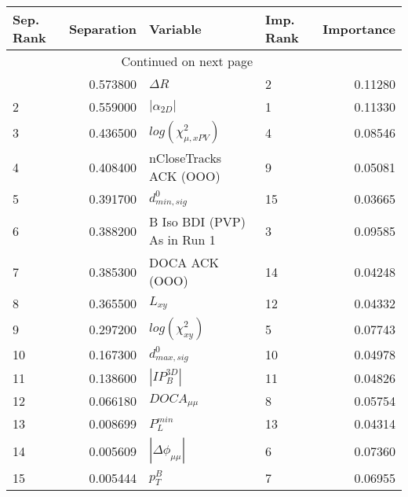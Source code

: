 \usepackage{lscape}

\begin{landscape}
\begin{longtable}{lrllr}
\toprule
Sep. Rank &  Separation &                     Variable & Imp. Rank &  Importance \\
\midrule
\endhead
\midrule
\multicolumn{3}{r}{{Continued on next page}} \\
\midrule
\endfoot

\bottomrule
\endlastfoot
        1 &    0.573800 &                   $\Delta R$ &         2 &     0.11280 \\
        2 &    0.559000 &              $|\alpha_{2D}|$ &         1 &     0.11330 \\
        3 &    0.436500 &    $log(\chi^{2}_{\mu,xPV})$ &         4 &     0.08546 \\
        4 &    0.408400 &       nCloseTracks ACK (OOO) &         9 &     0.05081 \\
        5 &    0.391700 &             $d^0_{min, sig}$ &        15 &     0.03665 \\
        6 &    0.388200 &  B Iso BDI (PVP) As in Run 1 &         3 &     0.09585 \\
        7 &    0.385300 &               DOCA ACK (OOO) &        14 &     0.04248 \\
        8 &    0.365500 &                     $L_{xy}$ &        12 &     0.04332 \\
        9 &    0.297200 &         $log(\chi^{2}_{xy})$ &         5 &     0.07743 \\
       10 &    0.167300 &             $d^0_{max, sig}$ &        10 &     0.04978 \\
       11 &    0.138600 &              $|IP_{B}^{3D}|$ &        11 &     0.04826 \\
       12 &    0.066180 &              $DOCA_{\mu\mu}$ &         8 &     0.05754 \\
       13 &    0.008699 &                $P^{min}_{L}$ &        13 &     0.04314 \\
       14 &    0.005609 &     $|\Delta \phi_{\mu\mu}|$ &         6 &     0.07360 \\
       15 &    0.005444 &                    $p^B_{T}$ &         7 &     0.06955 \\
\end{longtable}

\end{landscape}
